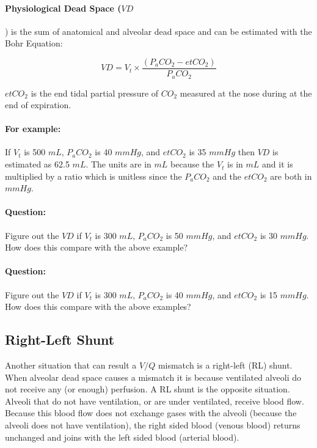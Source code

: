 \paragraph{Physiological Dead Space ($VD$}) is the sum of anatomical and alveolar dead space and can be estimated with the Bohr Equation:

\begin{equation}
    VD = V_t \times \frac{(P_aCO_2 - etCO_2)}{P_aCO_2}
    \label{eq:bohr}
 \end{equation}
 
$etCO_2$ is the end tidal partial pressure of $CO_2$ measured at the nose during at the end of expiration.

\paragraph{For example:} If $V_t$ is 500 $mL$, $P_aCO_2$ is 40 $mmHg$, and $etCO_2$ is 35 $mmHg$ then $VD$ is estimated as 62.5 $mL$. The units are in $mL$ because the $V_t$ is in $mL$ and it is multiplied by a ratio which is unitless since the $P_aCO_2$ and the $etCO_2$ are both in $mmHg$.

\paragraph{Question:} Figure out the $VD$ if $V_t$ is 300 $mL$, $P_aCO_2$ is 50 $mmHg$, and $etCO_2$ is 30 $mmHg$. How does this compare with the above example? 

\paragraph{Question:} Figure out the $VD$ if $V_t$ is 300 $mL$, $P_aCO_2$ is 40 $mmHg$, and $etCO_2$ is 15 $mmHg$. How does this compare with the above examples?

\subsection{Right-Left Shunt}

Another situation that can result a $V/Q$ mismatch is a right-left (RL) shunt. When alveolar dead space causes a mismatch it is because ventilated alveoli do not receive any (or enough) perfusion. A RL shunt is the opposite situation. Alveoli that do not have ventilation, or are under ventilated, receive blood flow. Because this blood flow does not exchange gases with the alveoli (because the alveoli does not have ventilation), the right sided blood (venous blood) returns unchanged and joins with the left sided blood (arterial blood). 

